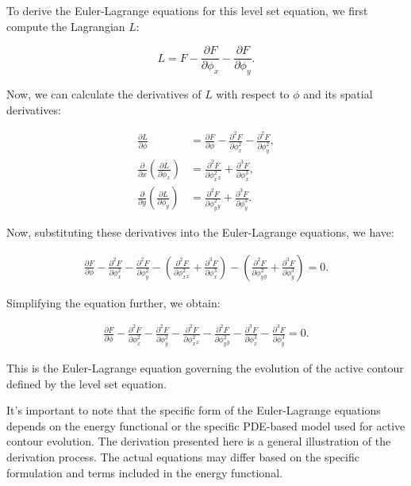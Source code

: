 \documentclass[]{report}
\begin{document}
To derive the Euler-Lagrange equations for this level set equation, we first compute the Lagrangian $L$:

\begin{equation}
    L = F - \frac{\partial F}{\partial \phi_x} - \frac{\partial F}{\partial \phi_y}.
\end{equation}

Now, we can calculate the derivatives of $L$ with respect to $\phi$ and its spatial derivatives:

\begin{align}
    \frac{\partial L}{\partial \phi} &= \frac{\partial F}{\partial \phi} - \frac{\partial^2 F}{\partial \phi_x^2} - \frac{\partial^2 F}{\partial \phi_y^2}, \\
    \frac{\partial}{\partial x}\left(\frac{\partial L}{\partial \phi_x}\right) &= \frac{\partial^2 F}{\partial \phi_x^2_x} + \frac{\partial^3 F}{\partial \phi_x^3}, \\
    \frac{\partial}{\partial y}\left(\frac{\partial L}{\partial \phi_y}\right) &= \frac{\partial^2 F}{\partial \phi_y^2_y} + \frac{\partial^3 F}{\partial \phi_y^3}.
\end{align}

Now, substituting these derivatives into the Euler-Lagrange equations, we have:

\begin{align}
    \frac{\partial F}{\partial \phi} - \frac{\partial^2 F}{\partial \phi_x^2} - \frac{\partial^2 F}{\partial \phi_y^2} - \left(\frac{\partial^2 F}{\partial \phi_x^2_x} + \frac{\partial^3 F}{\partial \phi_x^3}\right) - \left(\frac{\partial^2 F}{\partial \phi_y^2_y} + \frac{\partial^3 F}{\partial \phi_y^3}\right) = 0.
\end{align}

Simplifying the equation further, we obtain:

\begin{align}
    \frac{\partial F}{\partial \phi} - \frac{\partial^2 F}{\partial \phi_x^2} - \frac{\partial^2 F}{\partial \phi_y^2} - \frac{\partial^2 F}{\partial \phi_x^2_x} - \frac{\partial^2 F}{\partial \phi_y^2_y} - \frac{\partial^3 F}{\partial \phi_x^3} - \frac{\partial^3 F}{\partial \phi_y^3} = 0.
\end{align}

This is the Euler-Lagrange equation governing the evolution of the active contour defined by the level set equation.

It's important to note that the specific form of the Euler-Lagrange equations depends on the energy functional or the specific PDE-based model used for active contour evolution. The derivation presented here is a general illustration of the derivation process. The actual equations may differ based on the specific formulation and terms included in the energy functional.
\end{document}
